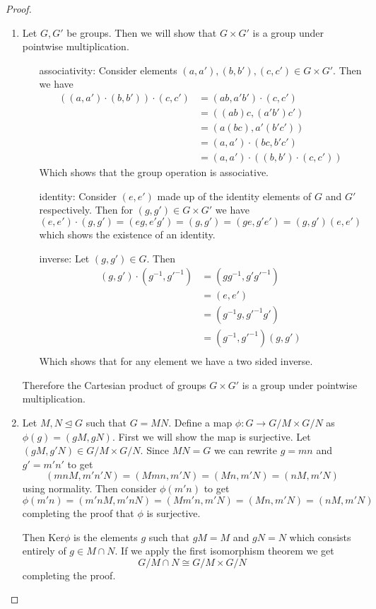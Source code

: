 \documentclass[10pt]{article}
\theoremstyle{plain}
\theoremstyle{remark}
\begin{document}
\begin{proof}
  \begin{enumerate}
  \item Let $G,G'$ be groups. Then we will show that $G\times G'$ is a group
    under pointwise multiplication.

    \begin{enumerate}
    \item[associativity:] Consider elements $(a,a'),(b,b'),(c,c')\in G\times G'$.
      Then we have
      \begin{align*}
        ((a,a')\cdot(b,b'))\cdot(c,c')&=(ab,a'b')\cdot(c,c')\\
                              &=((ab)c,(a'b')c')\\
                              &= (a(bc),a'(b'c'))\\
                              &=(a,a')\cdot(bc,b'c')\\
                              &=(a,a')\cdot((b,b')\cdot(c,c'))
      \end{align*}
      Which shows that the group operation is associative.
    \item[identity:] Consider $(e,e')$ made up of the identity elements of
      $G$ and $G'$ respectively. Then for $(g,g')\in G\times G'$ we have
      \[ (e,e')\cdot(g,g')=(eg,e'g')=(g,g')=(ge,g'e')=(g,g')(e,e')\]
      which shows the existence of an identity.
    \item[inverse:] Let $(g,g')\in G$. Then 
      \begin{align*}
        (g,g')\cdot(g^{-1},g'^{-1}) &=(gg^{-1},g'g'^{-1})\\
                                &=(e,e')\\
                                &=(g^{-1}g,g'^{-1}g')\\
                                &=(g^{-1},g'^{-1})(g,g')\\
      \end{align*}
      Which shows that for any element we have a two sided inverse.
    \end{enumerate}
    Therefore the Cartesian product of groups $G\times G'$ is a group under pointwise
    multiplication.

  \item Let $M,N\trianglelefteq G$  such that $G=MN$. Define a map
    $\phi:G\rightarrow G/M\times G/N$ as $\phi(g)=(gM,gN)$. First we will show the
    map is surjective. Let $(gM,g'N)\in G/M\times G/N$. Since $MN=G$ we can rewrite
    $g=mn$ and $g'=m'n'$ to get
    \[ (mnM,m'n'N)=(Mmn,m'N)=(Mn,m'N)=(nM,m'N)\]
    using normality. Then consider $\phi(m'n)$ to get
    \[ \phi(m'n)=(m'nM,m'nN)=(Mm'n,m'N)=(Mn,m'N)=(nM,m'N)\]
    completing the proof that $\phi$ is surjective.

    Then $\text{Ker}\phi$ is the elements $g$ such that $gM=M$ and $gN=N$ which
    consists entirely of $g\in M\cap N$. If we apply the first isomorphism theorem
    we get
    \[ G/M\cap N \cong G/M\times G/N\]
    completing the proof.
  \end{enumerate}
\end{proof}
\end{document}
